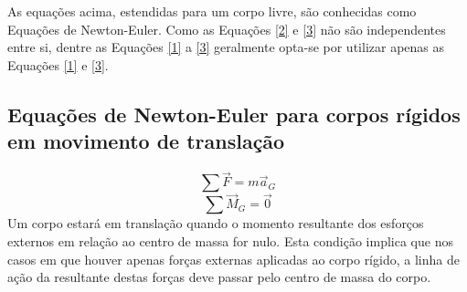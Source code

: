 \documentclass[a4paper, 12pt]{article}
\begin{document}
		As equações acima, estendidas para um corpo livre, são conhecidas como Equações de Newton-Euler.
		Como as Equações \ref{2} e \ref{3} não são independentes entre si, dentre as Equações \ref{1} a \ref{3} geralmente opta-se por utilizar apenas as Equações \ref{1} e \ref{3}.
	
	\subsection{Equações de Newton-Euler para corpos rígidos em movimento de translação}
		\begin{equation}
			\sum \vec{F} = m\vec{a}_G
		\end{equation}
		\begin{equation}
			\sum \vec{M}_G = \vec{0}
		\end{equation}
		Um corpo estará em translação quando o momento resultante dos esforços externos em relação ao centro de massa for nulo. Esta condição implica que nos casos em que houver apenas forças externas aplicadas ao corpo rígido, a linha de ação da resultante destas forças deve passar pelo centro de massa do corpo.
	
\end{document}
